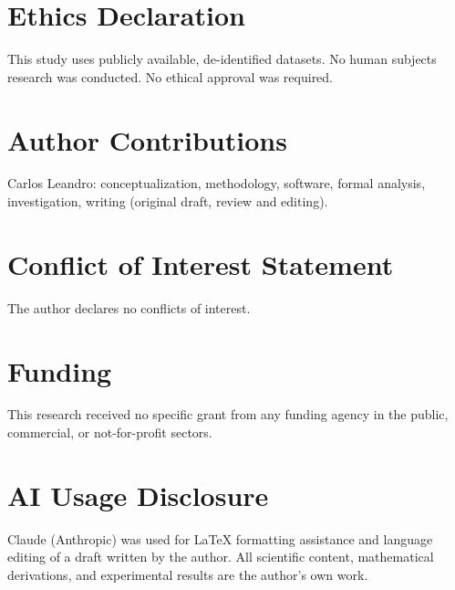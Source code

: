 \documentclass[10pt,a4paper,twoside]{article}
\begin{document}
\section*{Ethics Declaration}

This study uses publicly available, de-identified datasets.
No human subjects research was conducted.
No ethical approval was required.

\section*{Author Contributions}

Carlos Leandro: conceptualization, methodology, software, formal analysis,
investigation, writing (original draft, review and editing).

\section*{Conflict of Interest Statement}

The author declares no conflicts of interest.

\section*{Funding}

This research received no specific grant from any funding agency in the public,
commercial, or not-for-profit sectors.

\section*{AI Usage Disclosure}

Claude (Anthropic) was used for LaTeX formatting assistance and language
editing of a draft written by the author.
All scientific content, mathematical derivations, and experimental results are
the author's own work.



\end{document}
